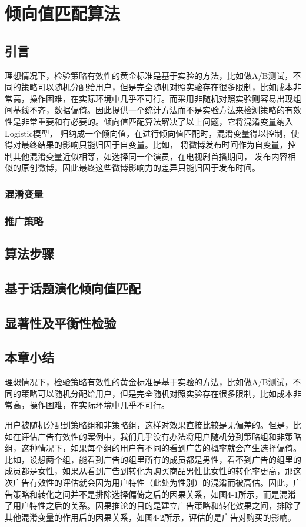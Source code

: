 \chapter{倾向值匹配算法}

\section{引言}

理想情况下，检验策略有效性的黄金标准是基于实验的方法，比如做A/B测试，不同的策略可以随机分配给用户，但是完全随机对照实验存在很多限制，比如成本非常高，操作困难，在实际环境中几乎不可行。而采用非随机对照实验则容易出现组间基线不齐，数据偏倚。因此提供一个统计方法而不是实验方法来检测策略的有效性是非常重要和有必要的。倾向值匹配算法解决了以上问题，它将混淆变量纳入Logistic模型， 归纳成一个倾向值，在进行倾向值匹配时，混淆变量得以控制，使得对最终结果的影响只能归因于自变量\cite{胡安宁2012倾向值匹配与因果推论}。比如， 将微博发布时间作为自变量，控制其他混淆变量近似相等，如选择同一个演员，在电视剧首播期间， 发布内容相似的原创微博，因此最终这些微博影响力的差异只能归因于发布时间。


\subsection{混淆变量}
\subsection{推广策略}
\section{算法步骤}
\section{基于话题演化倾向值匹配}
\section{显著性及平衡性检验}
\section{本章小结}


理想情况下，检验策略有效性的黄金标准是基于实验的方法，比如做A/B测试，不同的策略可以随机分配给用户，但是完全随机对照实验存在很多限制，比如成本非常高，操作困难，在实际环境中几乎不可行。

用户被随机分配到策略组和非策略组，这样对效果直接比较是无偏差的。但是，比如在评估广告有效性的案例中，我们几乎没有办法将用户随机分到策略组和非策略组，这种情况下，如果每个组的用户有不同的看到广告的概率就会产生选择偏倚。比如，设想两个组，能看到广告的组里所有的成员都是男性，看不到广告的组里的成员都是女性，如果从看到广告到转化为购买商品男性比女性的转化率更高，那这次广告有效性的评估就会因为用户特性（此处为性别）的混淆而被高估。因此，广告策略和转化之间并不是排除选择偏倚之后的因果关系，如图4-1所示，而是混淆了用户特性之后的关系。因果推论的目的是建立广告策略和转化效果之间，排除了其他混淆变量的作用后的因果关系，如图4-2所示，评估的是广告对购买的影响。

